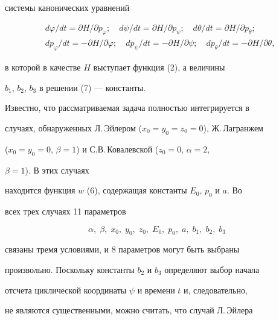 системы канонических уравнений


\begin{equation}


\begin{split}


&d\varphi/dt=\partial H/\partial p_\varphi;\quad


d\psi/dt=\partial H/\partial p_\psi;\quad


d\theta/dt=\partial H/\partial p_\theta;\\


&dp_\varphi/dt=-\partial H/\partial\varphi;\quad


dp_\psi/dt=-\partial H/\partial\psi;\quad


dp_\theta/dt=-\partial H/\partial\theta,


\end{split}


\end{equation}


в которой в качестве $H$ выступает функция (2), а величины


$b_1$, $b_2$, $b_3$ в решении (7) --- константы.





Известно, что рассматриваемая задача полностью интегрируется в


случаях, обнаруженных Л.\,Эйлером ($x_0=y_0=z_0=0$), Ж.\,Лагранжем


($x_0=y_0=0$, $\beta=1$) и С.В.\,Ковалевской ($z_0=0$, $\alpha=2$,


$\beta=1$). В этих случаях


находится функция $w$ (6), содержащая константы $E_0$, $p_0$ и $a$. Во


всех трех случаях 11 параметров


\begin{equation}


\alpha,\; \beta, \; x_0, \; y_0, \; z_0, \; E_0, \;


p_0, \; a, \; b_1, \; b_2, \; b_3


\end{equation}


связаны тремя условиями, и 8 параметров могут быть выбраны


произвольно. Поскольку константы $b_2$ и $b_3$ определяют выбор начала


отсчета циклической координаты $\psi$ и времени $t$ и, следовательно,


не являются существенными, можно считать, что случай Л.\,Эйлера


